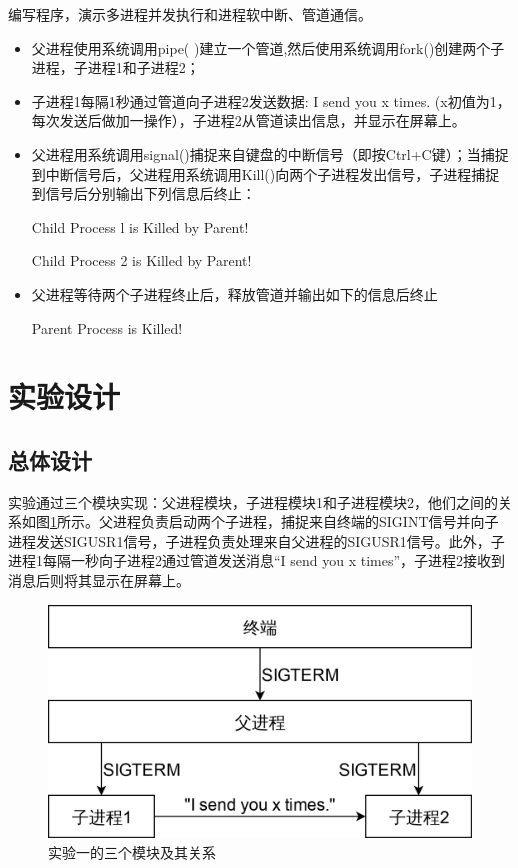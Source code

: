 \documentclass{report}
\begin{document}
编写程序，演示多进程并发执行和进程软中断、管道通信。

\begin{itemize}
    \item 父进程使用系统调用pipe( )建立一个管道,然后使用系统调用fork()创建两个子进程，子进程1和子进程2；
    \item 子进程1每隔1秒通过管道向子进程2发送数据: I send you x times. (x初值为1，每次发送后做加一操作），子进程2从管道读出信息，并显示在屏幕上。
    \item 父进程用系统调用signal()捕捉来自键盘的中断信号（即按Ctrl+C键）；当捕捉到中断信号后，父进程用系统调用Kill()向两个子进程发出信号，子进程捕捉到信号后分别输出下列信息后终止：\par
        Child Process l is Killed by Parent!\par
        Child Process 2 is Killed by Parent!\par
    \item 父进程等待两个子进程终止后，释放管道并输出如下的信息后终止\par
        Parent Process is Killed!
\end{itemize}

\section{实验设计}
\label{sec:shi_yan_she_ji_1}

\subsection{总体设计}
\label{sub:zong_ti_she_ji_1}

实验通过三个模块实现：父进程模块，子进程模块1和子进程模块2，他们之间的关系如图\ref{fig:exp1module}所示。父进程负责启动两个子进程，捕捉来自终端的SIGINT信号并向子进程发送SIGUSR1信号，子进程负责处理来自父进程的SIGUSR1信号。此外，子进程1每隔一秒向子进程2通过管道发送消息``I send you x times''，子进程2接收到消息后则将其显示在屏幕上。
\begin{figure}[ht]
    \centering
    \includegraphics[width=0.4\linewidth]{exp1module.png}
    \caption{实验一的三个模块及其关系}
    \label{fig:exp1module}
\end{figure}
\end{document}
